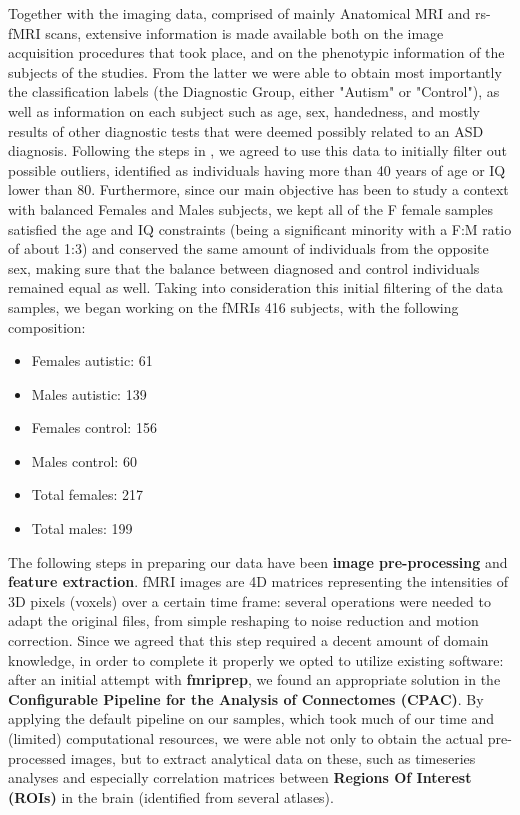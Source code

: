 \documentclass{article}
\newcommand{\compresslist}{ %
	\setlength{\itemsep}{1pt}
	\setlength{\parskip}{0pt}
	\setlength{\parsep}{0pt}
}
\begin{document}
Together with the imaging data, comprised of mainly Anatomical MRI and rs-fMRI scans, extensive information is made available both on the image acquisition procedures that took place, and on the phenotypic information of the subjects of the studies. From the latter we were able to obtain most importantly the classification labels (the Diagnostic Group, either "Autism" or "Control"), as well as information on each subject such as age, sex, handedness, and mostly results of other diagnostic tests that were deemed possibly related to an ASD diagnosis. Following the steps in \cite{guidelinesml}, we agreed to use this data to initially filter out possible outliers, identified as individuals having more than 40 years of age or IQ lower than 80. Furthermore, since our main objective has been to study a context with balanced Females and Males subjects, we kept all of the F female samples satisfied the age and IQ constraints (being a significant minority with a F:M ratio of about 1:3) and conserved the same amount of individuals from the opposite sex, making sure that the balance between diagnosed and control individuals remained equal as well. Taking into consideration this initial filtering of the data samples, we began working on the fMRIs 416 subjects, with the following composition:
\begin{itemize}\compresslist
	\item Females autistic: 61
	\item Males autistic: 139
	\item Females control: 156
	\item Males control: 60
	\item Total females: 217
	\item Total males: 199
\end{itemize}



The following steps in preparing our data have been \textbf{image pre-processing} and \textbf{feature extraction}. fMRI images are 4D matrices representing the intensities of 3D pixels (voxels) over a certain time frame: several operations were needed to adapt the original files, from simple reshaping to noise reduction and motion correction. Since we agreed that this step required a decent amount of domain knowledge, in order to complete it properly we opted to utilize existing software: after an initial attempt with \textbf{fmriprep}\cite{fmriprep}, we found an appropriate solution in the \textbf{Configurable Pipeline for the Analysis of Connectomes (CPAC)}\cite{cpac}. By applying the default pipeline on our samples, which took much of our time and (limited) computational resources, we were able not only to obtain the actual pre-processed images, but to extract analytical data on these, such as timeseries analyses and especially correlation matrices between \textbf{Regions Of Interest (ROIs)} in the brain (identified from several atlases).\\
\end{document}
